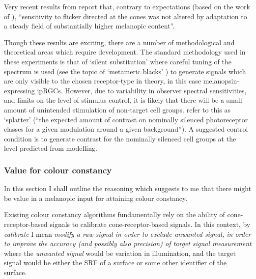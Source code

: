 Very recent results from \citet{vincent_adaptation_2019,vincent_adaptation_2019-1} report that, contrary to expectations (based on the work of \citet{allen_melanopsin-driven_2014}), ``sensitivity to flicker directed at the cones was not altered by adaptation to a steady field of substantially higher melanopic content''. 

Though these results are exciting, there are a number of methodological and theoretical areas which require development. The standard methodology used in these experiments is that of `silent substitution' \citep{estevez_silent_1982,kamar_silent-substitution_2019,spitschan_method_2018} where careful tuning of the spectrum is used (see the topic of `metameric blacks' \citep{vienot_verriest_2014,cohen_metameric_1982,vienot_domain_2012,vienot_dimensionality_2015}) to generate signals which are only visible to the chosen receptor-type in theory, in this case melanopsin-expressing \glspl{ipRGC}. However, due to variability in observer spectral sensitivities, and limits on the level of stimulus control, it is likely that there will be a small amount of unintended stimulation of non-target cell groups. \citet{spitschan_selective_2015} refer to this as `splatter' (``the expected amount of contrast on nominally silenced photoreceptor classes for a given modulation around a given background''). A suggested control condition is to generate contrast for the nominally silenced cell groups at the level predicted from modelling.

\subsubsection{Value for colour constancy}

In this section I shall outline the reasoning which suggests to me that there might be value in a melanopic input for attaining colour constancy.

Existing colour constancy algorithms fundamentally rely on the ability of cone-receptor-based signals to calibrate cone-receptor-based signals. In this context, by \emph{calibrate} I mean  \emph{modify a raw signal in order to exclude unwanted signal, in order to improve the accuracy (and possibly also precision) of target signal measurement} where the \emph{unwanted signal} would be variation in illumination, and the target signal would be either the \gls{SRF} of a surface or some other identifier of the surface.

